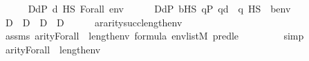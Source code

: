 \begin{isabellebody}
\isanewline
\ \ \ \ \isamarkupfalse%
\ {\isacharquery}{\kern0pt}D{}{\isacharequal}{\kern0pt}{\isachardoublequoteopen}{\isacharbraceleft}{\kern0pt}d{\isasymin}P{\isachardot}{\kern0pt}\ {\isacharparenleft}{\kern0pt}d\ {\isasymtturnstile}HS\ Forall{\isacharparenleft}{\kern0pt}{\isasymphi}{\isacharparenright}{\kern0pt}\ env{\isacharparenright}{\kern0pt}{\isacharbraceright}{\kern0pt}{\isachardoublequoteclose}\isanewline
\ \ \ \ \isamarkupfalse%
\ {\isacharquery}{\kern0pt}D{}{\isacharequal}{\kern0pt}{\isachardoublequoteopen}{\isacharbraceleft}{\kern0pt}d{\isasymin}P{\isachardot}{\kern0pt}\ {\isasymexists}b{\isasymin}HS{\isachardot}{\kern0pt}\ {\isasymforall}q{\isasymin}P{\isachardot}{\kern0pt}\ q{\isasympreceq}d\ {\isasymlongrightarrow}\ {\isasymnot}{\isacharparenleft}{\kern0pt}q\ {\isasymtturnstile}HS\ {\isasymphi}\ {\isacharparenleft}{\kern0pt}{\isacharbrackleft}{\kern0pt}b{\isacharbrackright}{\kern0pt}{\isacharat}{\kern0pt}env{\isacharparenright}{\kern0pt}{\isacharparenright}{\kern0pt}{\isacharbraceright}{\kern0pt}{\isachardoublequoteclose}\isanewline
\ \ \ \ \isamarkupfalse%
\ D\ \ {\isachardoublequoteopen}D\ {\isasymequiv}\ {\isacharquery}{\kern0pt}D{}\ {\isasymunion}\ {\isacharquery}{\kern0pt}D{}{\isachardoublequoteclose}\isanewline
\ \ \ \ \isamarkupfalse%
\ ar{\isasymphi}{\isacharcolon}{\kern0pt}{\isachardoublequoteopen}arity{\isacharparenleft}{\kern0pt}{\isasymphi}{\isacharparenright}{\kern0pt}{\isasymle}succ{\isacharparenleft}{\kern0pt}length{\isacharparenleft}{\kern0pt}env{\isacharparenright}{\kern0pt}{\isacharparenright}{\kern0pt}{\isachardoublequoteclose}\ \isanewline
\ \ \ \ \ \ \isamarkupfalse%
\ assms\ {\isacartoucheopen}arity{\isacharparenleft}{\kern0pt}Forall{\isacharparenleft}{\kern0pt}{\isasymphi}{\isacharparenright}{\kern0pt}{\isacharparenright}{\kern0pt}\ {\isasymle}\ length{\isacharparenleft}{\kern0pt}env{\isacharparenright}{\kern0pt}{\isacartoucheclose}\ {\isacartoucheopen}{\isasymphi}{\isasymin}formula{\isacartoucheclose}\ {\isacartoucheopen}env{\isasymin}list{\isacharparenleft}{\kern0pt}M{\isacharparenright}{\kern0pt}{\isacartoucheclose}\ pred{\isacharunderscore}{\kern0pt}le{}\ \isanewline
\ \ \ \ \ \ \isamarkupfalse%
\ simp\isanewline
\ \ \ \ \isamarkupfalse%
\isanewline
\ \ \ \ \isamarkupfalse%
\ {\isachardoublequoteopen}arity{\isacharparenleft}{\kern0pt}Forall{\isacharparenleft}{\kern0pt}{\isasymphi}{\isacharparenright}{\kern0pt}{\isacharparenright}{\kern0pt}\ {\isasymle}\ length{\isacharparenleft}{\kern0pt}env{\isacharparenright}{\kern0pt}{\isachardoublequoteclose}\ \isanewline

\end{isabellebody}
